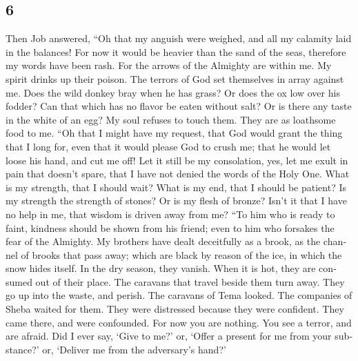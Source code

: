 \begin{paracol}{2}
\switchcolumn
\begin{otherlanguage}{english}

\hypertarget{section-11}{%
\section{6}\label{section-11}}

 Then Job answered,  ``Oh that my anguish
were weighed, and all my calamity laid in the balances! 
For now it would be heavier than the sand of the seas, therefore my
words have been rash.  For the arrows of the Almighty are
within me. My spirit drinks up their poison. The terrors of God set
themselves in array against me.  Does the wild donkey bray
when he has grass? Or does the ox low over his fodder? 
Can that which has no flavor be eaten without salt? Or is there any
taste in the white of an egg?  My soul refuses to touch
them. They are as loathsome food to me.  ``Oh that I might
have my request, that God would grant the thing that I long for,
 even that it would please God to crush me; that he would
let loose his hand, and cut me off!  Let it still be my
consolation, yes, let me exult in pain that doesn't spare, that I have
not denied the words of the Holy One.  What is my
strength, that I should wait? What is my end, that I should be patient?
 Is my strength the strength of stones? Or is my flesh of
bronze?  Isn't it that I have no help in me, that wisdom
is driven away from me?  ``To him who is ready to faint,
kindness should be shown from his friend; even to him who forsakes the
fear of the Almighty.  My brothers have dealt deceitfully
as a brook, as the channel of brooks that pass away; 
which are black by reason of the ice, in which the snow hides itself.
 In the dry season, they vanish. When it is hot, they are
consumed out of their place.  The caravans that travel
beside them turn away. They go up into the waste, and perish.
 The caravans of Tema looked. The companies of Sheba
waited for them.  They were distressed because they were
confident. They came there, and were confounded.  For now
you are nothing. You see a terror, and are afraid.  Did I
ever say, `Give to me?' or, `Offer a present for me from your
substance?'  or, `Deliver me from the adversary's hand?'

\end{otherlanguage}
\end{paracol}
